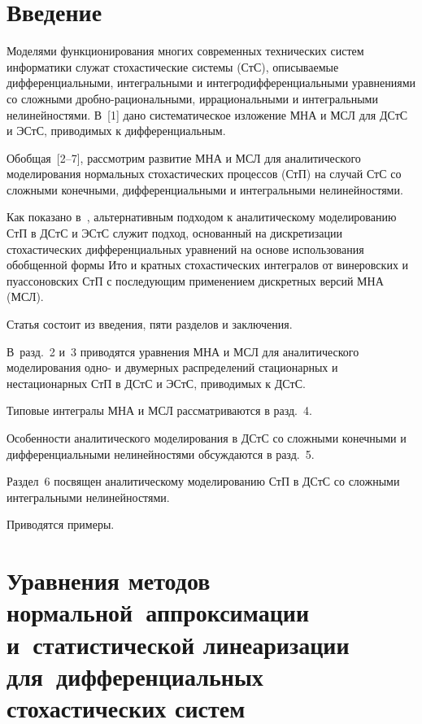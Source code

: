 \vspace*{9pt}


\thispagestyle{headings}

\begin{multicols}{2}

\label{st\stat}


\section{Введение}


Моделями функционирования многих современных технических сис\-тем информатики
служат стохастические системы (СтС), описываемые дифференциальными, интегральными
и интегродифференциальными уравнениями со сложными дроб\-но-ра\-ци\-о\-наль\-ны\-ми,
иррациональными и интегральными нелинейностями. В~[1] дано систематическое
изложение МНА и МСЛ для ДСтС и ЭСтС, приводимых к дифференциальным.

Обобщая~[2--7], рассмотрим развитие МНА и МСЛ для аналитического моделирования
нормальных стохастических процессов (СтП) на случай СтС со сложными конечными,
дифференциальными и интегральными нелинейностями.

Как показано в~\cite{4-sin}, альтернативным подходом к аналитическому моделированию
СтП в ДСтС и ЭСтС служит подход, основанный на дискретизации стохастических
дифференциальных уравнений на основе использования обобщенной формы Ито и
кратных стохастических интегралов от винеровских и пуассоновских СтП с
последующим применением дискретных версий МНА (МСЛ).

Статья состоит из введения, пяти разделов и заключения.

В~разд.~2 и~3
приводятся уравнения МНА и МСЛ для аналитического моделирования одно- и
двумерных распределений стационарных и нестационарных СтП в ДСтС и ЭСтС,
приводимых к ДСтС.

Типовые интегралы МНА и МСЛ рассматриваются в разд.~4.

Особенности аналитического моделирования в ДСтС со сложными конечными и
дифференциальными нелинейностями обсуждаются в разд.~5.

Раздел~6
посвящен аналитическому моделированию СтП в ДСтС со сложными интегральными
нелинейностями.

Приводятся примеры.


\section{Уравнения методов нормальной~аппроксимации и~статистической
линеаризации для~дифференциальных стохастических систем}


\end{multicols}
